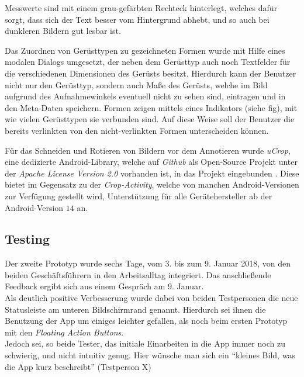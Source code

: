 Messwerte sind mit einem grau-gefärbten Rechteck hinterlegt, welches dafür sorgt, dass sich der Text besser vom Hintergrund abhebt, und so auch bei dunkleren Bildern gut lesbar ist.

Das Zuordnen von Gerüsttypen zu gezeichneten Formen wurde mit Hilfe eines modalen Dialogs umgesetzt, der neben dem Gerüsttyp auch noch Textfelder für die verschiedenen Dimensionen des Gerüsts besitzt.
Hierdurch kann der Benutzer nicht nur den Gerüsttyp, sondern auch Maße des Gerüsts, welche im Bild aufgrund des Aufnahmewinkels eventuell nicht zu sehen sind, eintragen und in den Meta-Daten speichern.
Formen zeigen mittels eines Indikators (siehe fig), mit wie vielen Gerüsttypen sie verbunden sind.
Auf diese Weise soll der Benutzer die bereits verlinkten von den nicht-verlinkten Formen unterscheiden können. \\

Für das Schneiden und Rotieren von Bildern vor dem Annotieren wurde \emph{uCrop}, eine dedizierte Android-Library, welche auf \emph{Github} als Open-Source Projekt unter der \emph{Apache License Version 2.0} vorhanden ist, in das Projekt eingebunden \citep{UC18}.
Diese bietet im Gegensatz zu der \emph{Crop-Activity}, welche von manchen Android-Versionen zur Verfügung gestellt wird, Unterstützung für alle Gerätehersteller ab der Android-Version $14$ an.

\subsection{Testing}\label{subsec:test2}
Der zweite Prototyp wurde sechs Tage, vom 3. bis zum 9. Januar 2018, von den beiden Geschäftsführern in den Arbeitsalltag integriert.
Das anschließende Feedback ergibt sich aus einem Gespräch am 9. Januar. \\

Als deutlich positive Verbesserung wurde dabei von beiden Testpersonen die neue Statusleiste am unteren Bildschirmrand genannt.
Hierdurch sei ihnen die Benutzung der App um einiges leichter gefallen, als noch beim ersten Prototyp mit den \emph{Floating Action Buttons}. \\

Jedoch sei, so beide Tester, das initiale Einarbeiten in die App immer noch zu schwierig, und nicht intuitiv genug.
Hier wünsche man sich ein ``kleines Bild, was die App kurz beschreibt'' (Testperson X) \\


